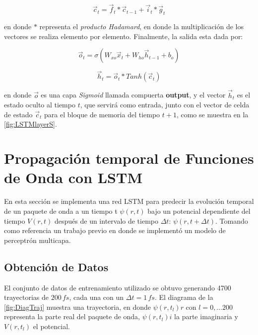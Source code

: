 \begin{equation}\label{eq:ct}
\vec{c}_t = \vec{f}_t \ast \vec{c}_{t-1} + \vec{i}_t \ast \vec{g}_t
\end{equation}

en donde $\ast$ representa el \emph{producto Hadamard}, en donde la multiplicación de los vectores se realiza elemento por elemento. Finalmente, la salida esta dada por:

\begin{equation}\label{eq:ot}
\vec{o}_t = \sigma(W_{xo}\vec{x}_t + W_{ho}\vec{h}_{t-1} + b_o)
\end{equation}

\begin{equation}\label{eq:ht}
\vec{h}_t = \vec{o}_t\ast Tanh(\vec{c}_t)
\end{equation}

en donde $\vec{o}$ es una capa \emph{Sigmoid} llamada compuerta \textbf{output}, y el vector $\vec{h}_t$ es el estado oculto al tiempo $t$, que servirá como entrada, junto con el vector de celda de estado $\vec{c}_t$ para el bloque de memoria del tiempo $t+1$, como se muestra en la \autoref{fig:LSTMlayerS}.


\section{Propagación temporal de Funciones de Onda con LSTM}\label{sec:Project}

En esta sección se implementa una red \acs{LSTM} para predecir la evolución temporal de un paquete de onda a un tiempo t $\psi(r,t)$ bajo un potencial dependiente del tiempo $V(r,t)$ después de un intervalo de tiempo $\Delta t$: $\psi(r,t+\Delta t)$. Tomando como referencia un trabajo previo \cite{Main:2021} en donde se implementó un modelo de perceptrón multicapa.

\subsection{Obtención de Datos}

El conjunto de datos de entrenamiento utilizado se obtuvo generando 4700 trayectorias de $200\,fs$, cada una con un $\Delta t = 1\,fs$. El diagrama de la \autoref{fig:DiagTraj} muestra una trayectoria, en donde $\psi(r,t_l)r$ con $l=0,\dots 200$ representa la parte real del paquete de onda, $\psi(r,t_l)i$ la parte imaginaria y $V(r,t_l)$ el potencial.

